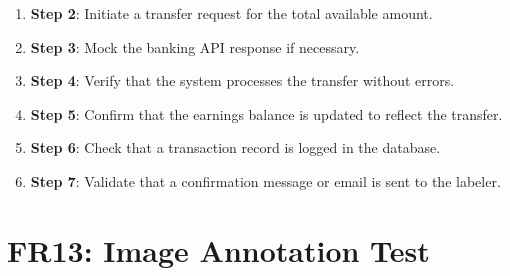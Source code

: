 \documentclass[12pt, titlepage]{article}
\begin{document}
\begin{enumerate}
\begin{itemize}
\begin{enumerate}
            \item \textbf{Step 2}: Initiate a transfer request for the total available amount.
            \item \textbf{Step 3}: Mock the banking API response if necessary.
            \item \textbf{Step 4}: Verify that the system processes the transfer without errors.
            \item \textbf{Step 5}: Confirm that the earnings balance is updated to reflect the transfer.
            \item \textbf{Step 6}: Check that a transaction record is logged in the database.
            \item \textbf{Step 7}: Validate that a confirmation message or email is sent to the labeler.
        \end{enumerate}
    \end{itemize}
\end{enumerate}

\section*{FR13: Image Annotation Test}
\end{document}

